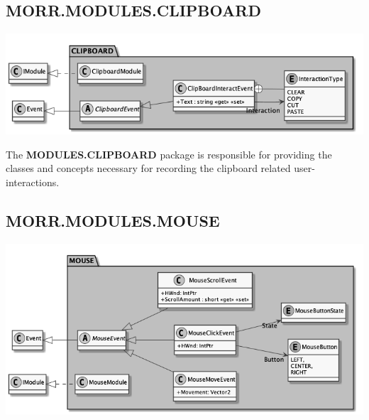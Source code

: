\newpage
\subsection*{MORR.MODULES.CLIPBOARD}

\begin{center}
    \includegraphics[width=1.0\textwidth]{resources/Packages/MODULES_CLIPBOARD.png}
\end{center}

The \textbf{MODULES.CLIPBOARD} package is responsible for providing the classes and concepts necessary for recording the clipboard related user-interactions.

\begin{packclass}
\end{packclass}

\begin{packenum}
\end{packenum}

\newpage
\subsection*{MORR.MODULES.MOUSE}

\begin{center}
    \includegraphics[width=1.0\textwidth]{resources/Packages/MODULES_MOUSE.png}
\end{center}

